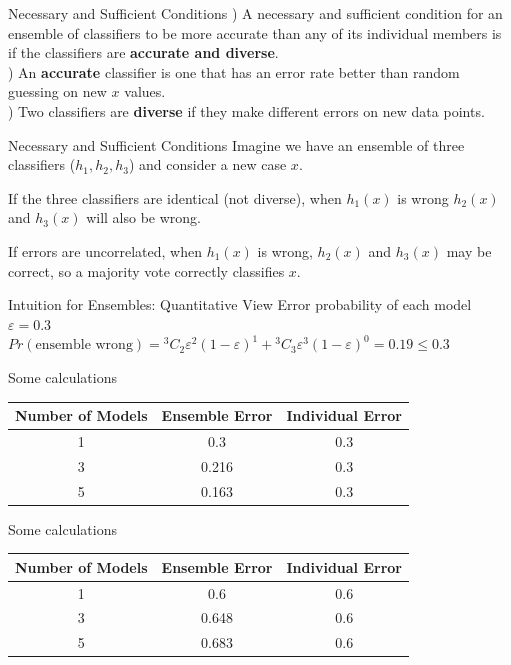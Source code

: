 \documentclass[aspectratio=169,10pt]{beamer}
\newcommand*{\Comb}[2]{{}^{#1}C_{#2}}%
\begin{document}
\begin{frame}{Necessary and Sufficient Conditions}
  \small
  ) A necessary and sufficient condition for an ensemble of classifiers to be more
  accurate than any of its individual members is if the classifiers are \textbf{accurate and
  diverse}.\\[0.4em]

  ) An \textbf{accurate} classifier \pause is one that has an
  error rate better than random guessing on new $x$ values.\\[0.4em]

  ) Two classifiers are \textbf{diverse} \pause if they make different errors on new data points.
\end{frame}

\begin{frame}{Necessary and Sufficient Conditions}
  Imagine we have an ensemble of three classifiers ($h_1, h_2, h_3$) and consider a new case $x$.

  \pause If the three classifiers are identical (not diverse),
  when $h_1(x)$ is wrong $h_2(x)$ and $h_3(x)$ will also be wrong.

  \pause If errors are uncorrelated, when $h_1(x)$
  is wrong, $h_2(x)$ and $h_3(x)$ may be correct, so a majority vote correctly
  classifies $x$.
\end{frame}

\begin{frame}{Intuition for Ensembles: Quantitative View}
  \small
  \pause Error probability of each model $\varepsilon=0.3$\\[0.6em]
  $Pr(\text{ensemble wrong}) = \Comb{3}{2}\varepsilon^2(1-\varepsilon)^{1} + \Comb{3}{3}\varepsilon^3(1-\varepsilon)^0
  = 0.19 \le 0.3$
\end{frame}

\begin{frame}{Some calculations}
  \small
  \centering
  \begin{tabular}{c|c|c}
  Number of Models & Ensemble Error & Individual Error \\
  \hline
  1 & 0.3 & 0.3 \\
  3 & 0.216 & 0.3 \\
  5 & 0.163 & 0.3 \\
  \end{tabular}
\end{frame}

\begin{frame}{Some calculations}
  \small
  \centering
  \begin{tabular}{c|c|c}
  Number of Models & Ensemble Error & Individual Error \\
  \hline
  1 & 0.6 & 0.6 \\
  3 & 0.648 & 0.6 \\
  5 & 0.683 & 0.6 \\
  \end{tabular}
\end{frame}
\end{document}
